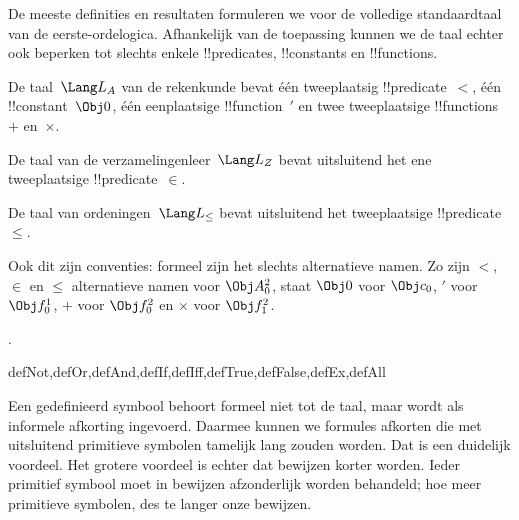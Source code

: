 \documentclass[../../../include/open-logic-section]{subfiles}
\begin{document}
De meeste definities en resultaten formuleren we voor de volledige
standaardtaal van de eerste-ordelogica. Afhankelijk van de toepassing
kunnen we de taal echter ook beperken tot slechts enkele
!!{predicate}s, !!{constant}s en !!{function}s.

\begin{ex}
De taal~$\Lang L_A$ van de rekenkunde bevat één tweeplaatsig
!!{predicate}~$<$, één !!{constant}~$\Obj 0$, één eenplaatsige
!!{function}~$\prime$ en twee tweeplaatsige !!{function}s~$+$ en~$\times$.
\end{ex}

\begin{ex}
De taal van de verzamelingenleer~$\Lang L_Z$ bevat uitsluitend het ene
tweeplaatsige !!{predicate}~$\in$.
\end{ex}

\begin{ex}
De taal van ordeningen~$\Lang L_\le$ bevat uitsluitend het
tweeplaatsige !!{predicate}~$\le$.
\end{ex}

Ook dit zijn conventies: formeel zijn het slechts alternatieve namen.
Zo zijn $<$, $\in$ en $\le$ alternatieve namen voor $\Obj A^2_0$, staat
$\Obj 0$ voor $\Obj c_0$, $\prime$ voor $\Obj f^1_0$, $+$ voor
$\Obj f^2_0$ en $\times$ voor $\Obj f^2_1$.

.

\begin{tagblock}{defNot,defOr,defAnd,defIf,defIff,defTrue,defFalse,defEx,defAll}
\begin{explain}
Een gedefinieerd symbool behoort formeel niet tot de taal, maar wordt
als informele afkorting ingevoerd. Daarmee kunnen we formules afkorten
die met uitsluitend primitieve symbolen tamelijk lang zouden worden.
Dat is een duidelijk voordeel. Het grotere voordeel is echter dat
bewijzen korter worden. Ieder primitief symbool moet in bewijzen
afzonderlijk worden behandeld; hoe meer primitieve symbolen, des te
langer onze bewijzen.
\end{explain}
\end{tagblock}
\end{document}
